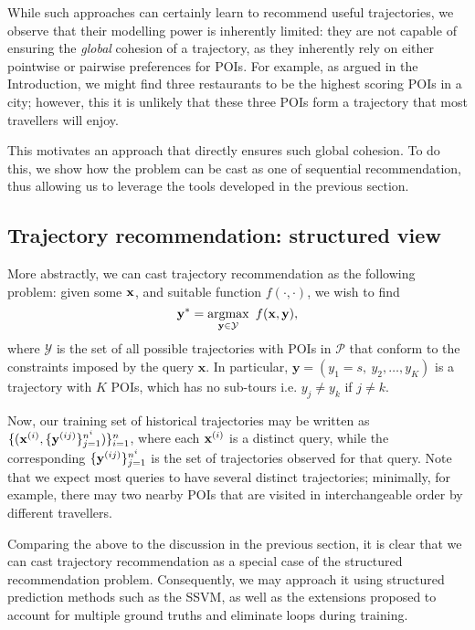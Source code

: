 While such approaches can certainly learn to recommend useful trajectories,
we observe that their modelling power is inherently limited:
they are not capable of ensuring the \emph{global} cohesion of a trajectory,
as they inherently rely on either pointwise or pairwise preferences for POIs.
For example, as argued in the Introduction,
we might find three restaurants to be the highest scoring POIs in a city;
however, this it is unlikely that these three POIs form a trajectory that most travellers will enjoy.

This motivates an approach that directly ensures such global cohesion.
To do this, we show how the problem can be cast as one of sequential recommendation, 
thus allowing us to leverage the tools developed in the previous section.


%
\subsection{Trajectory recommendation: structured view}

More abstractly, we can cast trajectory recommendation as the following problem:
given some $\mathbf{x}$, and suitable function $f(\cdot,\cdot)$, we wish to find
\begin{equation*}
\mathbf{y}^* = \operatorname*{argmax}_{\mathbf{y} \in \mathcal{Y}}~f(\mathbf{x}, \mathbf{y}),
\end{equation*}
where $\mathcal{Y}$ is the set of all possible trajectories with POIs in $\mathcal{P}$ that conform to the constraints imposed by the query $\mathbf{x}$.
In particular,
$\mathbf{y} = (y_1 = s,~ y_2, \dots, y_K)$ is a trajectory with $K$ POIs, which has no sub-tours i.e. $y_j \ne y_k$ if $j \ne k$.

Now, our training set of historical trajectories may be written as
$\{ ( \mathbf{x}^{({i})}, \{ \mathbf{y}^{({ij})} \}_{j=1}^{n^i} ) \}_{i=1}^{n}$,
where each $\mathbf{x}^{({i})}$ is a distinct query,
while the corresponding $\{ \mathbf{y}^{({ij})} \}_{j=1}^{n^i}$ is the set of trajectories observed for that query.
Note that we expect most queries to have several distinct trajectories;
minimally,
for example,
there may two nearby POIs that are visited in interchangeable order by different travellers.

Comparing the above to the discussion in the previous section, it is clear that
we can cast trajectory recommendation as a special case of the structured recommendation problem.
Consequently, we may approach it using structured prediction methods such as the SSVM,
as well as the extensions proposed to account for multiple ground truths and eliminate loops during training.

